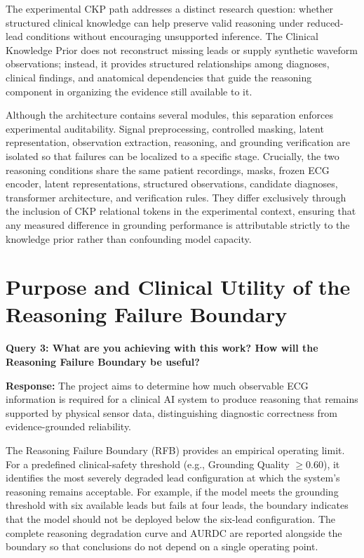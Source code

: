 \documentclass{ssnreview}
\begin{document}
The experimental CKP path addresses a distinct research question: whether structured
clinical knowledge can help preserve valid reasoning under reduced-lead conditions without
encouraging unsupported inference. The Clinical Knowledge Prior does not reconstruct missing
leads or supply synthetic waveform observations; instead, it provides structured relationships
among diagnoses, clinical findings, and anatomical dependencies that guide the reasoning
component in organizing the evidence still available to it.

Although the architecture contains several modules, this separation enforces experimental
auditability. Signal preprocessing, controlled masking, latent representation, observation
extraction, reasoning, and grounding verification are isolated so that failures can be
localized to a specific stage. Crucially, the two reasoning conditions share the same patient
recordings, masks, frozen ECG encoder, latent representations, structured observations,
candidate diagnoses, transformer architecture, and verification rules. They differ exclusively
through the inclusion of CKP relational tokens in the experimental context, ensuring that any
measured difference in grounding performance is attributable strictly to the knowledge prior
rather than confounding model capacity.

\section{Purpose and Clinical Utility of the Reasoning Failure Boundary}

\textbf{Query 3: What are you achieving with this work? How will the Reasoning Failure
Boundary be useful?}

\textbf{Response:} The project aims to determine how much observable ECG information is
required for a clinical AI system to produce reasoning that remains supported by physical
sensor data, distinguishing diagnostic correctness from evidence-grounded reliability.

The Reasoning Failure Boundary (RFB) provides an empirical operating limit. For a
predefined clinical-safety threshold (e.g., Grounding Quality $\ge 0.60$), it identifies the
most severely degraded lead configuration at which the system's reasoning remains acceptable.
For example, if the model meets the grounding threshold with six available leads but fails at
four leads, the boundary indicates that the model should not be deployed below the six-lead
configuration. The complete reasoning degradation curve and AURDC are reported alongside the
boundary so that conclusions do not depend on a single operating point.
\end{document}
